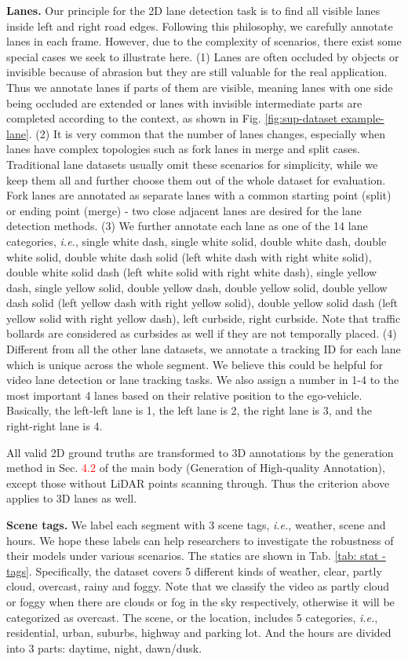 \documentclass[runningheads]{llncs}
\begin{document}
\textbf{Lanes.}
Our principle for the 2D lane detection task is to find all visible lanes inside left and right road edges.
Following this philosophy, we carefully annotate lanes in each frame. However, due to the complexity of scenarios, there exist some special cases we seek to illustrate here.
(1) Lanes are often occluded by objects or invisible because of abrasion but they are still valuable for the real application. Thus we annotate lanes if parts of them are visible, meaning lanes with one side being occluded are extended or lanes with invisible intermediate parts are completed according to the context, as shown in Fig. \ref{fig:sup-dataset example-lane}.
(2) It is very common that the number of lanes changes, especially when lanes have complex topologies such as fork lanes in merge and split cases. Traditional lane datasets usually omit these scenarios for simplicity, while we keep them all and further choose them out of the whole dataset for evaluation. Fork lanes are annotated as separate lanes with a common starting point (split) or ending point (merge) - two close adjacent lanes are desired for the lane detection methods.
(3) We further annotate each lane as one of the 14 lane categories, \textit{i.e.}, single white dash, single white solid, double white dash, double white solid, double white dash solid (left white dash with right white solid), double white solid dash (left white solid with right white dash), single yellow dash, single yellow solid, double yellow dash, double yellow solid, double yellow dash solid (left yellow dash with right yellow solid), double yellow solid dash (left yellow solid with right yellow dash), left curbside, right curbside. Note that traffic bollards are considered as curbsides as well if they are not temporally placed.
(4) Different from all the other lane datasets, we annotate a tracking ID for each lane which is unique across the whole segment. We believe this could be helpful for video lane detection or lane tracking tasks.
We also assign a number in 1-4 to the most important 4 lanes based on their relative position to the ego-vehicle. Basically, the left-left lane is 1, the left lane is 2, the right lane is 3, and the right-right lane is 4.

All valid 2D ground truths are transformed to 3D annotations by the generation method in Sec. \textcolor{red}{4.2} of the main body (Generation of High-quality Annotation), except those without LiDAR points scanning through. Thus the criterion above applies to 3D lanes as well.


\textbf{Scene tags.}
We label each segment with 3 scene tags, \textit{i.e.}, weather, scene and hours. We hope these labels can help researchers to investigate the robustness of their models under various scenarios.
The statics are shown in Tab. \ref{tab: stat - tags}.
Specifically, the dataset covers 5 different kinds of weather, clear, partly cloud, overcast, rainy and foggy. Note that we classify the video as partly cloud or foggy when there are clouds or fog in the sky respectively, otherwise it will be categorized as overcast.
The scene, or the location, includes 5 categories, \textit{i.e.}, residential, urban, suburbs, highway and parking lot.
And the hours are divided into 3 parts: daytime, night, dawn/dusk.
\end{document}

